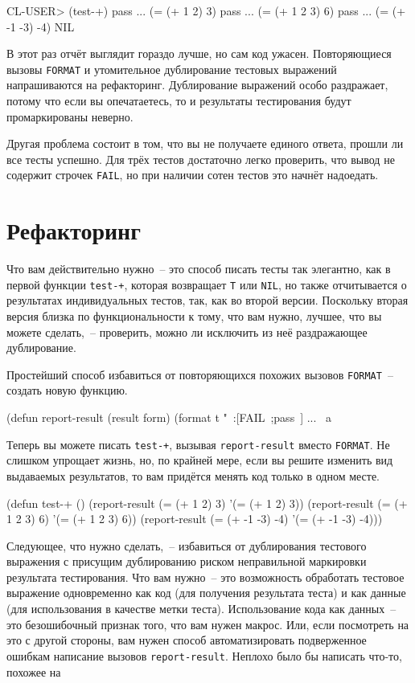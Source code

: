 \begin{myverb}
CL-USER> (test-+)
pass ... (= (+ 1 2) 3)
pass ... (= (+ 1 2 3) 6)
pass ... (= (+ -1 -3) -4)
NIL
\end{myverb}

В этот раз отчёт выглядит гораздо лучше, но сам код ужасен. Повторяющиеся вызовы
\lstinline{FORMAT} и утомительное дублирование тестовых выражений напрашиваются на
рефакторинг. Дублирование выражений особо раздражает, потому что если вы опечатаетесь, то
и результаты тестирования будут промаркированы неверно.

Другая проблема состоит в том, что вы не получаете единого ответа, прошли ли все
тесты успешно. Для трёх тестов достаточно легко проверить, что вывод не содержит
строчек \lstinline{FAIL}, но при наличии сотен тестов это начнёт надоедать.

\section{Рефакторинг}

Что вам действительно нужно~-- это способ писать тесты так элегантно, как в первой
функции \lstinline{test-+}, которая возвращает \lstinline{T} или \lstinline{NIL}, но также отчитывается о
результатах индивидуальных тестов, так, как во второй версии. Поскольку вторая версия
близка по функциональности к тому, что вам нужно, лучшее, что вы можете сделать,~--
проверить, можно ли исключить из неё раздражающее дублирование.

Простейший способ избавиться от повторяющихся похожих вызовов \lstinline{FORMAT}~-- создать
новую функцию.

\begin{myverb}
(defun report-result (result form)
  (format t "~:[FAIL~;pass~] ... ~a~%
\end{myverb}

Теперь вы можете писать \lstinline{test-+}, вызывая \lstinline{report-result} вместо
\lstinline{FORMAT}. Не слишком упрощает жизнь, но, по крайней мере, если вы решите изменить вид
выдаваемых результатов, то вам придётся менять код только в одном месте.

\begin{myverb}
(defun test-+ ()
  (report-result (= (+ 1 2) 3) '(= (+ 1 2) 3))
  (report-result (= (+ 1 2 3) 6) '(= (+ 1 2 3) 6))
  (report-result (= (+ -1 -3) -4) '(= (+ -1 -3) -4)))
\end{myverb}

Следующее, что нужно сделать,~-- избавиться от дублирования тестового выражения с
присущим дублированию риском неправильной маркировки результата тестирования. Что вам
нужно~-- это возможность обработать тестовое выражение одновременно как код (для
получения результата теста) и как данные (для использования в качестве метки
теста). Использование кода как данных~-- это безошибочный признак того, что вам нужен
макрос. Или, если посмотреть на это с другой стороны, вам нужен способ автоматизировать
подверженное ошибкам написание вызовов \lstinline{report-result}. Неплохо было бы написать
что-то, похожее на

